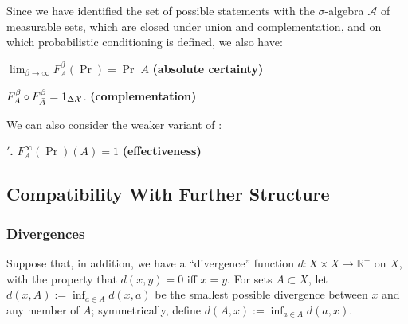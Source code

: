 \documentclass{article}
\DeclareMathOperator{\supp}{\mathrm{Supp}}
\begin{document}

Since we have identified the set of possible statements with the $\sigma$-algebra $\mathcal A$ of measurable sets, which are closed under union and complementation, and on which probabilistic conditioning is defined, we also have:

\begin{URaxioms}
    \item $\displaystyle \lim_{\beta\to\infty} F^\beta_A (\Pr) = \Pr|A$
    \hfill \textbf{(absolute certainty)} \label{ax:certainty}

    
    \item
    $F^\beta_A \circ F_{\bar A}^\beta = 1_{\Delta\mathcal X}$.
        \hfill \textbf{(complementation)} \label{ax:comp}
\end{URaxioms}


We can also consider the weaker variant of :
\begin{URaxioms}
    \item[\textbf{\Cref*{ax:certainty}$'$.}]  $F^\infty_A (\Pr)(A) = 1$
        \hfill \textbf{(effectiveness)} \label{ax:effectiveness}
\end{URaxioms}



\subsection{Compatibility With Further Structure}
\subsubsection*{Divergences}
Suppose that, in addition, we have a ``divergence'' function $d : X \times X \to \mathbb R^+$ on $X$, with the property that $d(x,y) = 0$ iff $x = y$.
For sets $A \subset X$, let $d(x, A) := \inf_{a \in A} d(x,a)$ be the smallest possible divergence between $x$ and any member of $A$; symmetrically, define $d(A, x) := \inf_{a \in A} d(a,x)$.
\end{document}
